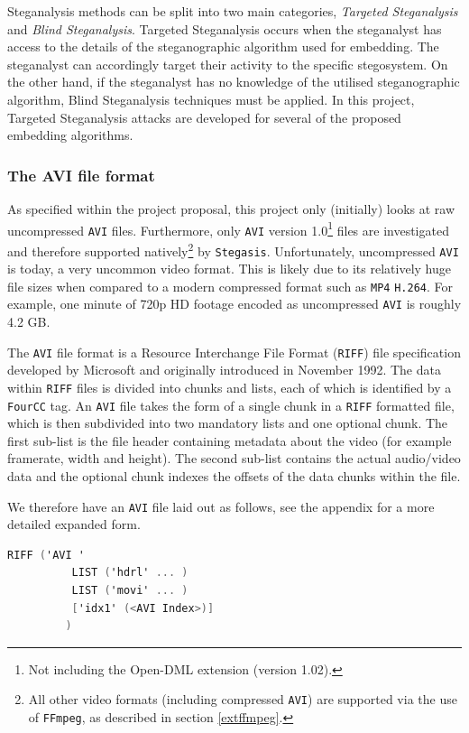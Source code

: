\documentclass[paper=a4, fontsize=11pt,twoside]{scrartcl}    %
\numberwithin{table}{section}
\numberwithin{figure}{section}
\begin{document}
Steganalysis methods can be split into two main categories, \textit{Targeted Steganalysis} and \textit{Blind Steganalysis}. Targeted Steganalysis occurs when the steganalyst has access to the details of the steganographic algorithm used for embedding. The steganalyst can accordingly target their activity to the specific stegosystem. On the other hand, if the steganalyst has no knowledge of the utilised steganographic algorithm, Blind Steganalysis techniques must be applied. In this project, Targeted Steganalysis attacks are developed for several of the proposed embedding algorithms.

\subsubsection{The AVI file format}
\label{avi}
As specified within the project proposal, this project only (initially) looks at raw uncompressed \texttt{AVI} files. Furthermore, only \texttt{AVI} version 1.0\footnote{Not including the Open-DML extension (version 1.02).} files are investigated and therefore supported natively\footnote{All other video formats (including compressed \texttt{AVI}) are supported via the use of \texttt{FFmpeg}, as described in section \ref{extffmpeg}.} by \texttt{Stegasis}. Unfortunately, uncompressed \texttt{AVI} is today, a very uncommon video format. This is likely due to its relatively huge file sizes when compared to a modern compressed format such as \texttt{MP4} \texttt{H.264}. For example, one minute of 720p HD footage encoded as uncompressed \texttt{AVI} is roughly 4.2 GB.

The \texttt{AVI} file format is a Resource Interchange File Format (\texttt{RIFF}) file specification developed by Microsoft and originally introduced in November 1992. The data within \texttt{RIFF} files is divided into chunks and lists, each of which is identified by a \texttt{FourCC} tag. An \texttt{AVI} file takes the form of a single chunk in a \texttt{RIFF} formatted file, which is then subdivided into two mandatory lists and one optional chunk. The first sub-list is the file header containing metadata about the video (for example framerate, width and height). The second sub-list contains the actual audio/video data and the optional chunk indexes the offsets of the data chunks within the file.

We therefore have an \texttt{AVI} file laid out as follows, see the appendix for a more detailed expanded form.
\begin{lstlisting}[language=C, caption={\texttt{AVI RIFF} form}, frame=single, upquote=true]
	RIFF ('AVI '
	      LIST ('hdrl' ... )
	      LIST ('movi' ... )
 	      ['idx1' (<AVI Index>)]
	     )
\end{lstlisting}
\end{document}
